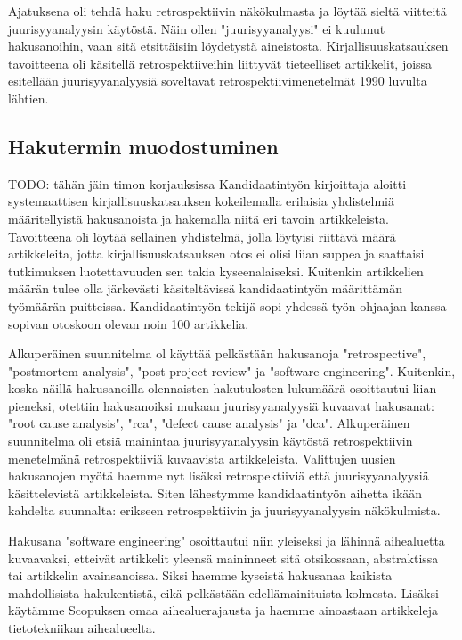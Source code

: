 Ajatuksena oli tehdä haku retrospektiivin näkökulmasta ja löytää sieltä viitteitä juurisyyanalyysin käytöstä. Näin ollen "juurisyyanalyysi" ei kuulunut hakusanoihin, vaan sitä etsittäisiin löydetystä aineistosta. Kirjallisuuskatsauksen tavoitteena oli käsitellä retrospektiiveihin liittyvät tieteelliset artikkelit, joissa esitellään juurisyyanalyysiä soveltavat retrospektiivimenetelmät 1990 luvulta lähtien.

\subsection{Hakutermin muodostuminen}
TODO: tähän jäin timon korjauksissa
Kandidaatintyön kirjoittaja aloitti systemaattisen kirjallisuuskatsauksen kokeilemalla erilaisia yhdistelmiä määritellyistä hakusanoista ja hakemalla niitä eri tavoin artikkeleista. Tavoitteena oli löytää sellainen yhdistelmä, jolla löytyisi riittävä määrä artikkeleita, jotta kirjallisuuskatsauksen otos ei olisi liian suppea ja saattaisi tutkimuksen luotettavuuden sen takia kyseenalaiseksi. Kuitenkin artikkelien määrän tulee olla järkevästi käsiteltävissä kandidaatintyön määrittämän työmäärän puitteissa. Kandidaatintyön tekijä sopi yhdessä työn ohjaajan kanssa sopivan otoskoon olevan noin 100 artikkelia.

Alkuperäinen suunnitelma ol käyttää pelkästään hakusanoja "retrospective",  "postmortem analysis", "post-project review" ja "software engineering". Kuitenkin, koska näillä hakusanoilla olennaisten hakutulosten lukumäärä osoittautui liian pieneksi, otettiin hakusanoiksi mukaan juurisyyanalyysiä kuvaavat hakusanat: "root cause analysis", "rca", "defect cause analysis" ja "dca". 
Alkuperäinen suunnitelma oli etsiä mainintaa juurisyyanalyysin käytöstä retrospektiivin menetelmänä retrospektiiviä kuvaavista artikkeleista. Valittujen uusien hakusanojen myötä haemme nyt lisäksi retrospektiiviä että juurisyyanalyysiä käsittelevistä artikkeleista. Siten lähestymme kandidaatintyön aihetta ikään kahdelta suunnalta: erikseen retrospektiivin ja juurisyyanalyysin näkökulmista.

Hakusana "software engineering" osoittautui niin yleiseksi ja lähinnä aihealuetta kuvaavaksi, etteivät artikkelit yleensä maininneet sitä otsikossaan, abstraktissa tai artikkelin avainsanoissa. Siksi haemme kyseistä hakusanaa kaikista mahdollisista hakukentistä, eikä pelkästään edellämainituista kolmesta. Lisäksi käytämme Scopuksen omaa aihealuerajausta ja haemme ainoastaan artikkeleja tietotekniikan aihealueelta.

